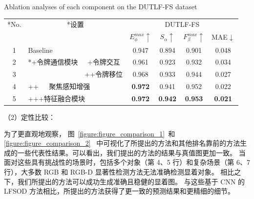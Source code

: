 \begin{table}[t]
	{Ablation analyses of each component on the DUTLF-FS dataset}
	\centering
	\label{table:abl_total}
	\label{chpt3:table:abl_total}
		\begin{tabular}{cllcccc}
			\toprule[2pt]  %
			
			\multicolumn{1}{c}{ \multirow{2}*{No.}} 
			& \multicolumn{2}{c}{ \multirow{2}*{设置}}	
			& \multicolumn{4}{c}{DUTLF-FS} \\
				
			\cmidrule(r){4-7} 
			
			& & & $E_{\phi}^{max}\uparrow$ & $S_{\alpha }\uparrow $ & $F_{\beta}^{max}\uparrow$ & MAE$\downarrow$ \\
			
	
			\midrule
	
			1 & \multicolumn{2}{l}{ Baseline }     & 0.947 & 0.894 & 0.901 & 0.048 \\ 
			
			
			\midrule
			
			2 & \multicolumn{1}{l}{ \multirow{2}*{+令牌通信模块}}	

			& \multicolumn{1}{c}{+令牌交互}  & 0.961 & 0.923 & 0.932 & 0.034 \\ 
			3 & & \multicolumn{1}{c}{++令牌移位} & 0.968 & 0.933 & 0.944 & 0.027 \\
			
			\midrule
			
			4 & \multicolumn{2}{l}{++~~~聚焦感知增强} 		
			& \textbf{0.972} & 0.941 & 0.952 & 0.022 \\
			
			5 & \multicolumn{2}{l}{+++特征融合模块} 		
			& \textbf{0.972} & \textbf{0.942} & \textbf{0.953} & \textbf{0.021} \\ 
			
			
			\bottomrule[2pt]
		\end{tabular}
\end{table}



（2）定性比较：

为了更直观地观察，
图~\ref{figure:figure_comparison_1}~和
\ref{figure:figure_comparison_2}~
中可视化了所提出的方法和其他排名靠前的方法生成的一些代表性结果。可以看出，我们提出的方法的结果与真值图更加一致。 当面对这些具有挑战性的场景时，包括多个对象（第 4、5 行）和复杂场景（第 6、7 行），大多数 RGB 和 RGB-D 显著性检测方法无法准确检测显着对象。
相比之下，我们所提出的方法可以成功生成准确且稳健的显着图。 与这些基于 CNN 的 LFSOD 方法相比，所提出的方法获得了更一致的预测结果和更精细的细节。









